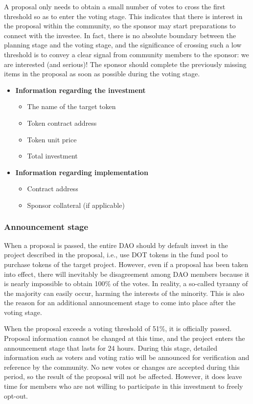 \documentclass[UTF8]{article}
\begin{document}
\begin{multicols}{2}
  A proposal only needs to obtain a small number of votes to cross the first threshold so as to enter the voting stage. This indicates that there is interest in the proposal within the community, so the sponsor may start preparations to connect with the investee. In fact, there is no absolute boundary between the planning stage and the voting stage, and the significance of crossing such a low threshold is to convey a clear signal from community members to the sponsor: we are interested (and serious)! The sponsor should complete the previously missing items in the proposal as soon as possible during the voting stage.

\begin{itemize}
\item \textbf{Information regarding the investment}
    \begin{itemize}
    \item The name of the target token
    \item Token contract address
    \item Token unit price
    \item Total investment
    \end{itemize}
\item \textbf{Information regarding implementation}
  \begin{itemize}
  \item Contract address
  \item Sponsor collateral (if applicable)
  \end{itemize}
  \end{itemize}


  \subsubsection{Announcement stage}

  When a proposal is passed, the entire DAO should by default invest in the project described in the proposal, i.e., use DOT tokens in the fund pool to purchase tokens of the target project. However, even if a proposal has been taken into effect, there will inevitably be disagreement among DAO members because it is nearly impossible to obtain 100\% of the votes. In reality, a so-called tyranny of the majority can easily occur, harming the interests of the minority. This is also the reason for an additional announcement stage to come into place after the voting stage.

  When the proposal exceeds a voting threshold of 51\%, it is officially passed. Proposal information cannot be changed at this time, and the project enters the announcement stage that lasts for 24 hours. During this stage, detailed information such as voters and voting ratio will be announced for verification and reference by the community. No new votes or changes are accepted during this period, so the result of the proposal will not be affected. However, it does leave time for members who are not willing to participate in this investment to freely opt-out.


\end{multicols}
\end{document}
